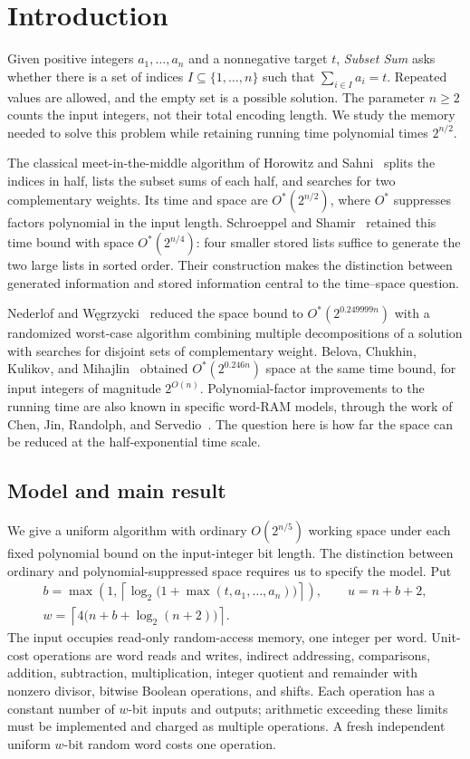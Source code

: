 \section{Introduction}
\label{sec:introduction}

Given positive integers $a_1,\ldots,a_n$ and a nonnegative target $t$,
\emph{Subset Sum} asks whether there is a set of indices
$I\subseteq\{1,\ldots,n\}$ such that $\sum_{i\in I}a_i=t$.
Repeated values are allowed, and the empty set is a possible solution.
The parameter $n\ge2$ counts the input integers, not their total
encoding length. We study the memory needed to solve this problem
while retaining running time polynomial times $2^{n/2}$.

The classical meet-in-the-middle algorithm of Horowitz and
Sahni~\cite{HS74} splits the indices in half, lists the subset sums
of each half, and searches for two complementary weights. Its time
and space are $O^*(2^{n/2})$, where $O^*$ suppresses factors polynomial
in the input length. Schroeppel and Shamir~\cite{SS81} retained this
time bound with space $O^*(2^{n/4})$: four smaller stored lists suffice
to generate the two large lists in sorted order. Their construction
makes the distinction between generated information and stored
information central to the time--space question.

Nederlof and W\k{e}grzycki~\cite{NW21} reduced the space bound to
$O^*(2^{0.249999n})$ with a randomized worst-case algorithm combining
multiple decompositions of a solution with searches for disjoint sets
of complementary weight. Belova, Chukhin,
Kulikov, and Mihajlin~\cite{BCKM24} obtained
$O^*(2^{0.246n})$ space at the same time bound, for input integers
of magnitude $2^{O(n)}$. Polynomial-factor improvements to the
running time are also known in specific word-RAM models, through the work of
Chen, Jin, Randolph, and Servedio~\cite{CJRS23}. The question here is
how far the space can be reduced at the half-exponential time scale.

\subsection{Model and main result}

We give a uniform algorithm with ordinary $O(2^{n/5})$ working space
under each fixed polynomial bound on the input-integer bit length.
The distinction between ordinary and polynomial-suppressed space
requires us to specify the model. Put
\[
\begin{gathered}
 b=\max\left(1,\left\lceil
 \log_2\bigl(1+\max(t,a_1,\ldots,a_n)\bigr)\right\rceil\right),
 \qquad u=n+b+2,\\
 w=\left\lceil4\bigl(n+b+\log_2(n+2)\bigr)\right\rceil.
\end{gathered}
\]
The input occupies read-only random-access memory, one integer per
word. Unit-cost operations are word reads and writes, indirect
addressing, comparisons, addition, subtraction, multiplication,
integer quotient and remainder with nonzero divisor, bitwise Boolean
operations, and shifts. Each operation has a constant number of
$w$-bit inputs and outputs; arithmetic exceeding these limits must
be implemented and charged as multiple operations. A fresh independent
uniform $w$-bit random word costs one operation.

